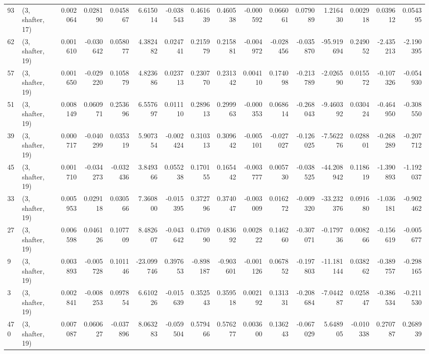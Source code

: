 \begin{tabular}{llrrrrrrrrrrrrrr}
93  &  (3, shafter, 17) &   0.002064 &  0.028190 &  0.045867 &    6.615014 & -0.038543 &   0.461639 &   0.460538 & -0.000592 &  0.066061 &  0.079089 &    1.216430 &  0.002918 &   0.039612 &   0.054395 \\
62  &  (3, shafter, 19) &   0.001610 & -0.030642 &  0.058077 &    4.382482 &  0.024741 &   0.215979 &   0.215881 & -0.004972 & -0.028456 & -0.035870 &  -95.919694 &  0.249052 &  -2.435213 &  -2.190395 \\
57  &  (3, shafter, 19) &   0.001650 & -0.029220 &  0.105879 &    4.823686 &  0.023713 &   0.230770 &   0.231342 &  0.004110 &  0.174098 & -0.213789 &   -2.026590 &  0.015572 &  -0.107326 &  -0.054930 \\
51  &  (3, shafter, 19) &   0.008149 &  0.060971 &  0.253696 &    6.557697 &  0.011110 &   0.289613 &   0.299963 & -0.000353 &  0.068614 & -0.268043 &   -9.460392 &  0.030424 &  -0.464950 &  -0.308550 \\
39  &  (3, shafter, 19) &   0.000717 & -0.040299 &  0.035319 &    5.907354 & -0.002424 &   0.310313 &   0.309642 & -0.005101 & -0.027027 & -0.126025 &   -7.562276 &  0.028801 &  -0.268289 &  -0.207712 \\
45  &  (3, shafter, 19) &   0.001710 & -0.034273 & -0.032436 &    3.849366 &  0.055238 &   0.170155 &   0.165442 & -0.003777 &  0.005730 & -0.038525 &  -44.208942 &  0.118619 &  -1.390893 &  -1.192037 \\
33  &  (3, shafter, 19) &   0.005953 &  0.029118 &  0.030566 &    7.360800 & -0.015395 &   0.372796 &   0.374047 & -0.003009 &  0.016272 & -0.009320 &  -33.232376 &  0.091680 &  -1.036181 &  -0.902462 \\
27  &  (3, shafter, 19) &   0.006598 &  0.046126 &  0.107709 &    8.482607 & -0.043642 &   0.476990 &   0.483692 &  0.002822 &  0.146260 & -0.307071 &   -0.179736 &  0.008266 &  -0.156619 &  -0.005677 \\
9   &  (3, shafter, 19) &   0.003893 & -0.005728 &  0.101146 &  -23.099746 &  0.397653 &  -0.898187 &  -0.903601 & -0.001126 &  0.067852 & -0.197803 &  -11.181144 &  0.038262 &  -0.389757 &  -0.298165 \\
3   &  (3, shafter, 19) &   0.002841 & -0.008253 &  0.097854 &    6.610226 & -0.015639 &   0.352543 &   0.359518 &  0.002192 &  0.131331 & -0.208684 &   -7.044287 &  0.025847 &  -0.386534 &  -0.211530 \\
470 &  (3, shafter, 19) &   0.007087 &  0.060627 & -0.037896 &    8.063283 & -0.059504 &   0.579466 &   0.576277 &  0.003600 &  0.136243 & -0.067029 &    5.648905 & -0.010338 &   0.270787 &   0.268939 \\

\end{tabular}

